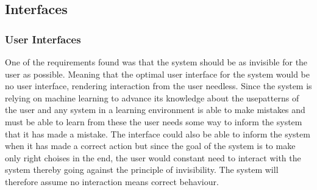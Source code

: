 \subsection{Interfaces}
\subsubsection{User Interfaces}
One of the requirements found was that the system should be as invisible for the user as possible. Meaning that the optimal user interface for the system would be no user interface, rendering  interaction from the user needless. Since the system is relying on machine learning to advance its knowledge about the usepatterns of the user and any system in a learning environment is able to make mistakes and must be able to learn from these the user needs some way to inform the system that it has made a mistake. The interface could also be able to inform the system when it has made a correct action but since the goal of the system is to make only right choises in the end, the user would constant need to interact with the system thereby going against the principle of invisibility. The system will therefore assume no interaction means correct behaviour.

